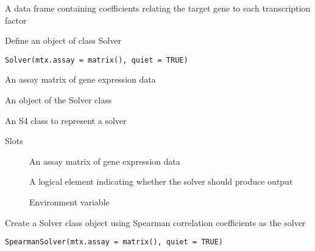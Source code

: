 \documentclass[a4paper]{book}
\begin{document}
%
\begin{Value}
A data frame containing coefficients relating the target gene to each transcription factor
\end{Value}
%
\begin{Description}\relax
Define an object of class Solver
\end{Description}
%
\begin{Usage}
\begin{verbatim}
Solver(mtx.assay = matrix(), quiet = TRUE)
\end{verbatim}
\end{Usage}
%
\begin{Arguments}
\begin{ldescription}
\item[\code{mtx.assay}] An assay matrix of gene expression data
\end{ldescription}
\end{Arguments}
%
\begin{Value}
An object of the Solver class
\end{Value}
%
\begin{Description}\relax
An S4 class to represent a solver
\end{Description}
%
\begin{Section}{Slots}

\begin{description}

\item[] An assay matrix of gene expression data

\item[] A logical element indicating whether the solver should produce output

\item[] Environment variable

\end{description}
\end{Section}
%
\begin{Description}\relax
Create a Solver class object using Spearman correlation coefficients as the solver
\end{Description}
%
\begin{Usage}
\begin{verbatim}
SpearmanSolver(mtx.assay = matrix(), quiet = TRUE)
\end{verbatim}
\end{Usage}
\end{document}
